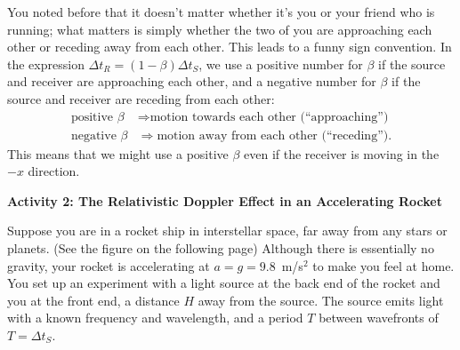 \begin{enumerate}[labparts]
You noted before that it doesn't matter whether it's you or your friend who is running; what matters is simply whether the two of you are approaching each other or receding away from each other.  This leads to a funny sign convention.  In the expression $\Delta t_R = (1 - \beta)\Delta t_S$, we use a positive number for $\beta$ if the source and receiver are approaching each other, and a negative number for $\beta$ if the source and receiver are receding from each other:  
\begin{align*}
\textrm{positive } \beta &\Longrightarrow \textrm{motion towards each other (``approaching'')} \\
\textrm{negative } \beta &\Longrightarrow \textrm{motion away from each other (``receding'')}. 
\end{align*}
This means that we might use a positive $\beta$ even if the receiver is moving in the $-x$ direction.
\end{enumerate}

\textbf{Activity 2: The Relativistic Doppler Effect in an Accelerating Rocket}

Suppose you are in a rocket ship in interstellar space, far away from any stars or planets.  (See the figure on the following page) Although there is essentially no gravity, your rocket is accelerating at $a=g=9.8$~m/s$^2$ to make you feel at home.  You set up an experiment with a light source at the back end of the rocket and you at the front end, a distance $H$ away from the source.  The source emits light with a known frequency and wavelength, and a period $T$ between wavefronts of $T=\Delta t_S$.


